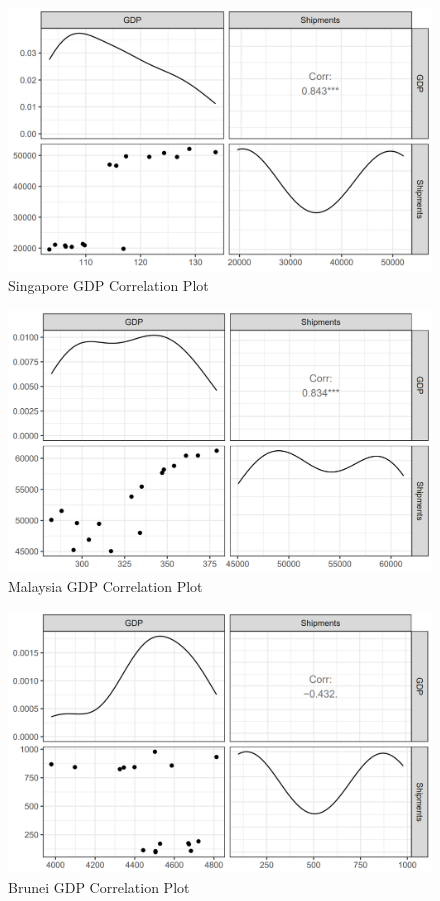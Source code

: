 \documentclass{article}
\begin{document}
\begin{figure}[H]
    \centering
    \includegraphics[width=1\textwidth]{images/Line Plots/Singapore/Singapore_Corrplot.png}
    \caption{Singapore GDP Correlation Plot}
    \label{fig:my_label}
\end{figure}

\begin{figure}[H]
    \centering
    \includegraphics[width=1\textwidth]{images/Line Plots/Malaysia/Malaysia_Corrplot.png}
    \caption{Malaysia GDP Correlation Plot}
    \label{fig:my_label}
\end{figure}

\begin{figure}[H]
    \centering
    \includegraphics[width=1\textwidth]{images/Line Plots/Brunei/Brunei_Corrplot.png}
    \caption{Brunei GDP Correlation Plot}
    \label{fig:my_label}
\end{figure}
\end{document}

